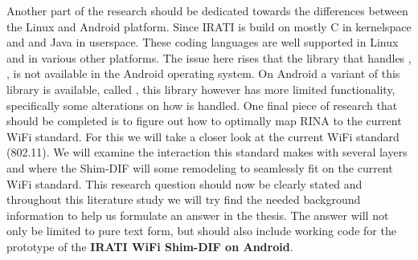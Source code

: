 \npar
Another part of the research should be dedicated towards the differences between the Linux and Android platform. Since IRATI is build on mostly C in kernelspace and \cpp and Java in userspace.  These coding languages are well supported in Linux and in various other platforms. The issue here rises that the library that handles \cpp, , is not available in the Android operating system. On Android a variant of this library is available, called , this library however has more limited functionality, specifically some alterations on how \cpp is handled.
\npar
One final piece of research that should be completed is to figure out how to optimally map RINA to the current WiFi standard. For this we will take a closer look at the current WiFi standard (802.11). We will examine the interaction this standard makes with several layers and where the Shim-DIF will some remodeling to seamlessly fit on the current WiFi standard.
\npar
This research question should now be clearly stated and throughout this literature study we will try find the needed background information to help us formulate an answer in the thesis. The answer will not only be limited to pure text form, but should also include working code for the prototype of the \textbf{IRATI WiFi Shim-DIF on Android}. 

